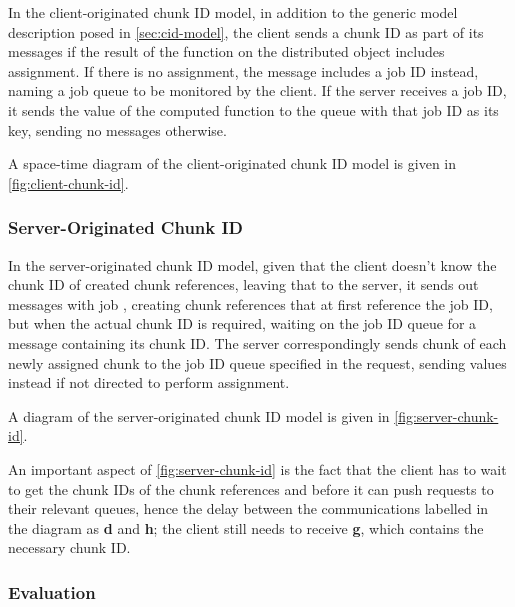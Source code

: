 In the client-originated chunk ID  model, in addition to the generic model description posed in \cref{sec:cid-model}, the client sends a chunk ID as part of its messages if the result of the function on the distributed object includes assignment.
If there is no assignment, the message includes a job ID instead, naming a job queue to be monitored by the client.
If the server receives a job ID, it sends the value of the computed function to the queue with that job ID as its key, sending no messages otherwise.

A space-time diagram of the client-originated chunk ID model is given in \cref{fig:client-chunk-id}.


\subsubsection{Server-Originated Chunk ID}

In the server-originated chunk ID model, given that the client doesn't know the chunk ID of created chunk references, leaving that to the server, it sends out messages with job , creating chunk references that at first reference the job ID, but when the actual chunk ID is required, waiting on the job ID queue for a message containing its chunk ID.
The server correspondingly sends chunk  of each newly assigned chunk to the job ID queue specified in the request, sending values instead if not directed to perform assignment.

A diagram of the server-originated chunk ID model is given in \cref{fig:server-chunk-id}.


An important aspect of \cref{fig:server-chunk-id} is the fact that the client has to wait to get the chunk IDs of the chunk references  and  before it can push requests to their relevant queues, hence the delay between the communications labelled in the diagram as \textcolor{dark2-3}{\textbf{d}} and \textcolor{dark2-3}{\textbf{h}}; the client still needs to receive \textcolor{dark2-1}{\textbf{g}}, which contains the necessary chunk ID.

\subsubsection{Evaluation}\label{sec:mod-eval}

